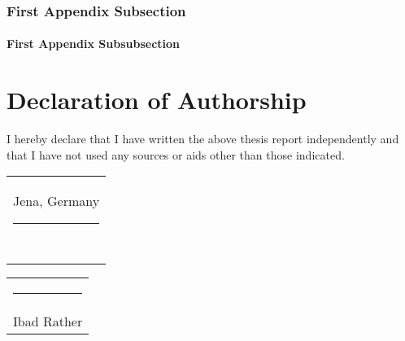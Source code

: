 \documentclass[
thesis  %
]{csthes}
\begin{document}
\subsection{First Appendix Subsection}
\subsubsection{First Appendix Subsubsection}

\cleardoublepage



\chapter*{Declaration of Authorship}

I hereby declare that I have written the above {\thesistype} thesis report independently and that I have not used any sources or aids other than those indicated. 

\bigskip

\begin{tabular}{@{}l@{}}
  Jena, Germany \rule[-0.8em]{7em}{0.5pt}\\[2ex]
  ~
\end{tabular}
\hspace{\fill}%
\begin{tabular}{@{}c@{}}
  \rule[-0.8em]{19em}{0.5pt}\\[2ex]
  {Ibad Rather}
\end{tabular}\hspace{\fill}

\end{document}
